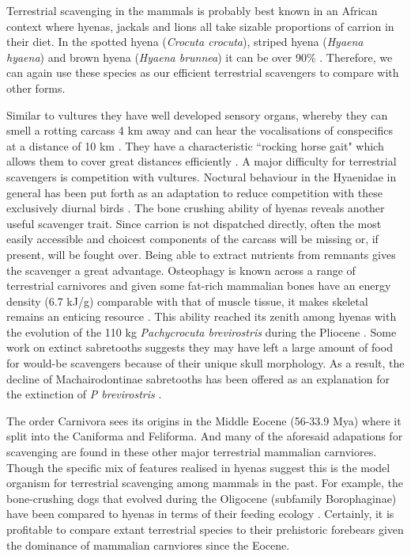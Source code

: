 \documentclass[a4paper,12pt]{article}
\begin{document}
Terrestrial scavenging in the mammals is probably best known in an African context where hyenas, jackals and lions all take sizable proportions of carrion in their diet.
In the spotted hyena (\textit{Crocuta crocuta}), striped hyena (\textit{Hyaena hyaena}) and brown hyena (\textit{Hyaena brunnea}) it can be over 90\% \citep{jones2015african}.
Therefore, we can again use these species as our efficient terrestrial scavengers to compare with other forms.


Similar to vultures they have well developed sensory organs, whereby they can smell a rotting carcass 4 km away and can hear the vocalisations of conspecifics at a distance of 10 km \citep{mills1989comparative}.
They have a characteristic ``rocking horse gait"  which allows them to cover great distances efficiently \citep{jones2015african}.
A major difficulty for terrestrial scavengers is competition with vultures.
Noctural behaviour in the Hyaenidae in general has been put forth as an adaptation to reduce competition with these exclusively diurnal birds \citep{gittleman2013carnivore}.
The bone crushing ability of hyenas reveals another useful scavenger trait.
Since carrion is not dispatched directly, often the most easily accessible and choicest components of the carcass will be missing or, if present, will be fought over.
Being able to extract nutrients from remnants gives the scavenger a great advantage.
Osteophagy is known across a range of terrestrial carnivores and given some fat-rich mammalian bones have an energy density (6.7 kJ/g) comparable with that of muscle tissue, it makes skeletal remains an enticing resource \citep{brown1989study}.
This ability reached its zenith among hyenas with the evolution of the 110 kg \textit{Pachycrocuta brevirostris} during the Pliocene \citep{palmqvist2011giant}.
Some work on extinct sabretooths suggests they may have left a large amount of food for would-be scavengers because of their unique skull morphology.
As a result, the decline of Machairodontinae sabretooths has been offered as an explanation for the extinction of \textit{P brevirostris} \citep{palmqvist2011giant}.


The order Carnivora sees its origins in the Middle Eocene (56-33.9 Mya) where it split into the Caniforma and Feliforma.
And many of the aforesaid adapations for scavenging are found in these other major terrestrial mammalian carnviores.
Though the specific mix of features realised in hyenas suggest this is the model organism for terrestrial scavenging among mammals in the past.
For example, the bone-crushing dogs that evolved during the Oligocene (subfamily Borophaginae) have been compared to hyenas in terms of their feeding ecology \citep{van2003chapter,martin2016pursuit}.
Certainly, it is profitable to compare extant terrestrial species to their prehistoric forebears given the dominance of mammalian carnviores since the Eocene.
 
\end{document}
